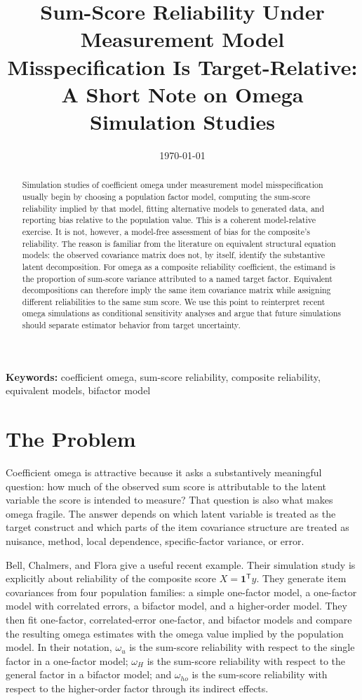 \documentclass[11pt]{article}
\title{Sum-Score Reliability Under Measurement Model Misspecification Is Target-Relative:\\
A Short Note on Omega Simulation Studies}
\author{}
\date{\today}
\newcommand{\T}{^{\mathsf T}}
\newcommand{\one}{\mathbf{1}}
\begin{document}
\maketitle

\begin{abstract}
Simulation studies of coefficient omega under measurement model
misspecification usually begin by choosing a population factor model, computing
the sum-score reliability implied by that model, fitting alternative models to
generated data, and reporting bias relative to the population value. This is a
coherent model-relative exercise. It is not, however, a model-free assessment of
bias for the composite's reliability. The reason is familiar from the
literature on equivalent structural equation models: the observed covariance
matrix does not, by itself, identify the substantive latent decomposition. For
omega as a composite reliability coefficient, the estimand is the proportion of
sum-score variance attributed to a named target factor. Equivalent
decompositions can therefore imply the same item covariance matrix while
assigning different reliabilities to the same sum score. We use this point to
reinterpret recent omega simulations as conditional sensitivity analyses and
argue that future simulations should separate estimator behavior from target
uncertainty.
\end{abstract}

\noindent\textbf{Keywords:} coefficient omega, sum-score reliability,
composite reliability, equivalent models, bifactor model

\section{The Problem}

Coefficient omega is attractive because it asks a substantively meaningful
question: how much of the observed sum score is attributable to the latent
variable the score is intended to measure? That question is also what makes
omega fragile. The answer depends on which latent variable is treated as the
target construct and which parts of the item covariance structure are treated as
nuisance, method, local dependence, specific-factor variance, or error.

Bell, Chalmers, and Flora \cite{bell2024} give a useful recent example. Their
simulation study is explicitly about reliability of the composite score
\(X=\one\T y\). They generate item covariances from four population families:
a simple one-factor model, a one-factor model with correlated errors, a
bifactor model, and a higher-order model. They then fit one-factor,
correlated-error one-factor, and bifactor models and compare the resulting
omega estimates with the omega value implied by the population model. In their
notation, \(\omega_u\) is the sum-score reliability with respect to the single
factor in a one-factor model; \(\omega_H\) is the sum-score reliability with
respect to the general factor in a bifactor model; and \(\omega_{ho}\) is the
sum-score reliability with respect to the higher-order factor through its
indirect effects.
\end{document}
